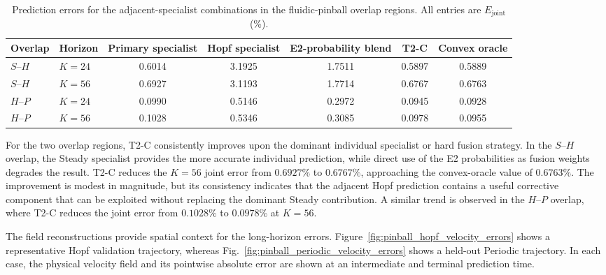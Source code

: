 \begin{table}[htbp]
\centering
\caption{Prediction errors for the adjacent-specialist combinations in the
fluidic-pinball overlap regions. All entries are
$E_{\mathrm{joint}}$ (\%).}
\label{tab:pinball_boundary_comparison}

\small
\renewcommand{\arraystretch}{1.10}
\setlength{\tabcolsep}{6pt}

\begin{tabular}{@{}llccccc@{}}
\toprule
Overlap
& Horizon
& Primary specialist
& Hopf specialist
& E2-probability blend
& T2-C
& Convex oracle \\
\midrule

$S$--$H$
& $K=24$
& 0.6014
& 3.1925
& 1.7511
& 0.5897
& 0.5889 \\

$S$--$H$
& $K=56$
& 0.6927
& 3.1193
& 1.7714
& 0.6767
& 0.6763 \\

\midrule

$H$--$P$
& $K=24$
& 0.0990
& 0.5146
& 0.2972
& 0.0945
& 0.0928 \\

$H$--$P$
& $K=56$
& 0.1028
& 0.5346
& 0.3085
& 0.0978
& 0.0955 \\

\bottomrule
\end{tabular}
\end{table}




For the two overlap regions, T2-C consistently improves upon the dominant
individual specialist or hard fusion strategy. In the $S$--$H$ overlap, the
Steady specialist provides the more accurate individual prediction, while
direct use of the E2 probabilities as fusion weights degrades the result.
T2-C reduces the $K=56$ joint error from $0.6927\%$ to $0.6767\%$, approaching
the convex-oracle value of $0.6763\%$. The improvement is modest in magnitude, but its
consistency indicates that the adjacent Hopf prediction contains a useful
corrective component that can be exploited without replacing the dominant
Steady contribution. A similar
trend is observed in the $H$--$P$ overlap, where T2-C reduces the joint error
from $0.1028\%$ to $0.0978\%$ at $K=56$. 



The field reconstructions provide spatial context for the long-horizon
errors. Figure~\ref{fig:pinball_hopf_velocity_errors} shows a representative
Hopf validation trajectory, whereas
Fig.~\ref{fig:pinball_periodic_velocity_errors} shows a held-out Periodic
trajectory. In each case, the physical velocity field and its pointwise
absolute error are shown at an intermediate and terminal prediction time.

